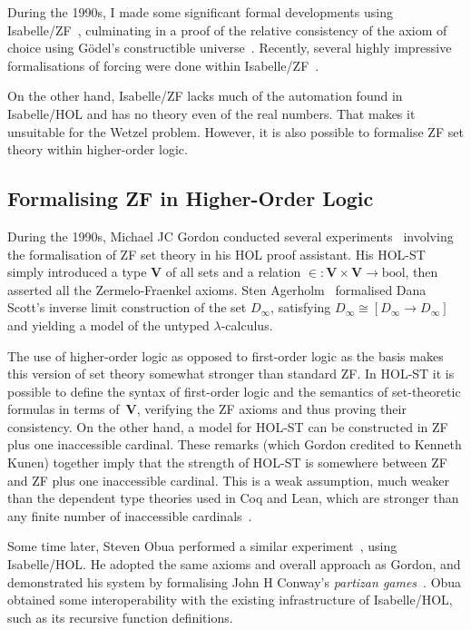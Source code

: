 \documentclass[runningheads]{llncs}
\newcommand{\V}{\mathbf{V}}
\newcommand{\bool}{\mathrm{bool}}
\begin{document}
During the 1990s, I made some significant formal developments using Isabelle/ZF~\cite{paulson-reflection}, culminating in a proof of the relative consistency of the axiom of choice using Gödel's constructible universe~\cite{paulson-consistency}. Recently, several highly impressive formalisations of forcing were done within Isabelle/ZF~\cite{gunther-forcing,Independence_CH-AFP}.

On the other hand, Isabelle/ZF lacks much of the automation found in Isabelle/HOL and has no theory even of the real numbers.
That makes it unsuitable for the Wetzel problem. However, it is also possible to formalise ZF set theory within higher-order logic.

\subsection{Formalising ZF in Higher-Order Logic}

During the 1990s, Michael JC Gordon conducted several experiments~\cite{gordon-set-theory} involving the formalisation of ZF set theory in his HOL proof assistant. 
His HOL-ST simply introduced a type $\V$ of all sets and a relation ${\in}:\V\times \V\to \bool$, then asserted all the Zermelo-Fraenkel axioms. 
Sten Agerholm~\cite{agerholm-comparison} formalised Dana Scott's inverse limit construction of the set $D_\infty$, satisfying
$D_\infty \cong [D_\infty\to D_\infty]$ and yielding a model of the untyped $\lambda$-calculus.

The use of higher-order logic as opposed to first-order logic as the basis makes this version of set theory somewhat stronger than standard ZF\@. 
In HOL-ST it is possible to define the syntax of first-order logic and the semantics of set-theoretic formulas in terms of~$\V$, verifying the ZF axioms and thus proving their consistency.
On the other hand, a model for HOL-ST can be constructed in ZF plus one inaccessible cardinal. 
These remarks (which Gordon credited to Kenneth Kunen) together imply that 
the strength of HOL-ST is somewhere between ZF and ZF plus one inaccessible cardinal.
This is a weak assumption, much weaker than the dependent type theories used in Coq and Lean, which are stronger than any finite number of inaccessible cardinals~\cite{werner-sets-types}.

Some time later, Steven Obua performed a similar experiment~\cite{obua-partizan-games}, using Isabelle/HOL\@.
He adopted the same axioms and overall approach as Gordon, and demonstrated his system by formalising John H Conway's \textit{partizan games}~\cite{schleicher-conways-games}.
Obua obtained some interoperability with the existing infrastructure of Isabelle/HOL, such as its recursive function definitions. 
\end{document}
